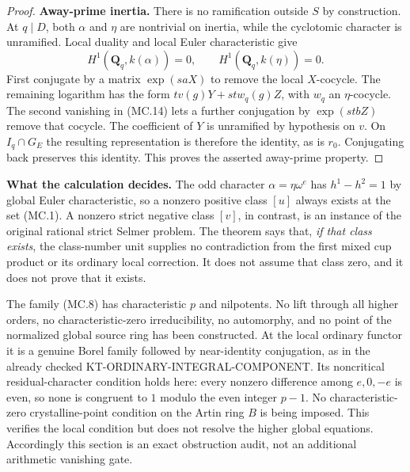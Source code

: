 \documentclass[11pt,a4paper]{article}
\theoremstyle{definition}
\renewcommand{\paragraph}[1]{\par\smallskip\noindent\textbf{#1}\quad\ignorespaces}
\begin{document}
\begin{proof}
\paragraph{Away-prime inertia.}
There is no ramification outside $S$ by construction.
At $q\mid D$, both $\alpha$ and $\eta$ are nontrivial on
inertia, while the cyclotomic character is unramified.
Local duality and local Euler characteristic give
\[
 H^1(\mathbf Q_q,k(\alpha))=0,
 \qquad H^1(\mathbf Q_q,k(\eta))=0.                     \tag{MC.14}
\]
First conjugate by a matrix $\exp(saX)$ to remove the local
$X$-cocycle.  The remaining logarithm has the form
$t v(g)Y+st w_q(g)Z$, with $w_q$ an $\eta$-cocycle.
The second vanishing in (MC.14) lets a further conjugation
by $\exp(stbZ)$ remove that cocycle.
The coefficient of $Y$ is unramified by hypothesis on $v$.
On $I_q\cap G_E$ the resulting representation is therefore
the identity, as is $r_0$.  Conjugating back preserves this
identity.  This proves the asserted away-prime property.
\end{proof}

\paragraph{What the calculation decides.}
The odd character $\alpha=\eta\omega^e$ has
$h^1-h^2=1$ by global Euler characteristic, so a nonzero
positive class $[u]$ always exists at the set (MC.1).
A nonzero strict negative class $[v]$, in contrast, is an
instance of the original rational strict Selmer problem.
The theorem says that, \emph{if that class exists}, the
class-number unit supplies no contradiction from the first
mixed cup product or its ordinary local correction.
It does not assume that class zero, and it does not prove
that it exists.

The family (MC.8) has characteristic $p$ and nilpotents.
No lift through all higher orders, no characteristic-zero
irreducibility, no automorphy, and no point of the normalized
global source ring has been constructed.  At the local
ordinary functor it is a genuine Borel family followed by
near-identity conjugation, as in the already checked
KT-ORDINARY-INTEGRAL-COMPONENT.  Its noncritical residual-character
condition holds here: every nonzero difference among $e,0,-e$
is even, so none is congruent to $1$ modulo the even integer
$p-1$.  No characteristic-zero crystalline-point condition
on the Artin ring $B$ is being imposed.
This verifies the local condition but does not resolve the
higher global equations.
Accordingly this section is an exact obstruction audit,
not an additional arithmetic vanishing gate.
\end{document}
